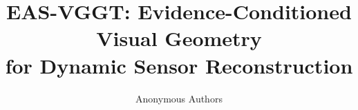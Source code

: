 \documentclass[10pt,twocolumn,letterpaper]{article}
\title{EAS-VGGT: Evidence-Conditioned Visual Geometry\\for Dynamic Sensor Reconstruction}
\author{Anonymous Authors}
\begin{document}
\maketitle








{\small


}
\end{document}
